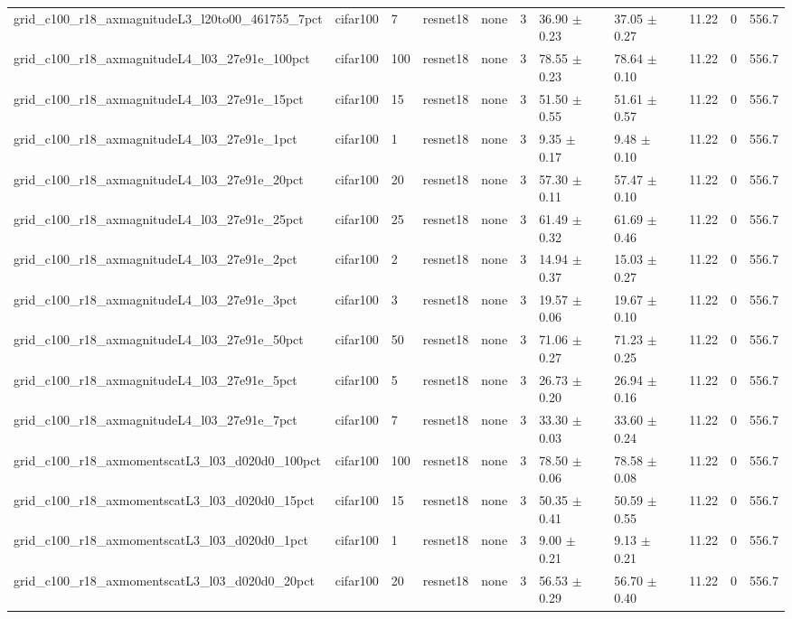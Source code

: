 \begin{tabular}{lllllllllll}
grid_c100_r18_axmagnitudeL3_l20to00_461755_7pct & cifar100 & 7 & resnet18 & none & 3 & 36.90 $\pm$ 0.23 & 37.05 $\pm$ 0.27 & 11.22 & 0 & 556.7 \\
grid_c100_r18_axmagnitudeL4_l03_27e91e_100pct & cifar100 & 100 & resnet18 & none & 3 & 78.55 $\pm$ 0.23 & 78.64 $\pm$ 0.10 & 11.22 & 0 & 556.7 \\
grid_c100_r18_axmagnitudeL4_l03_27e91e_15pct & cifar100 & 15 & resnet18 & none & 3 & 51.50 $\pm$ 0.55 & 51.61 $\pm$ 0.57 & 11.22 & 0 & 556.7 \\
grid_c100_r18_axmagnitudeL4_l03_27e91e_1pct & cifar100 & 1 & resnet18 & none & 3 & 9.35 $\pm$ 0.17 & 9.48 $\pm$ 0.10 & 11.22 & 0 & 556.7 \\
grid_c100_r18_axmagnitudeL4_l03_27e91e_20pct & cifar100 & 20 & resnet18 & none & 3 & 57.30 $\pm$ 0.11 & 57.47 $\pm$ 0.10 & 11.22 & 0 & 556.7 \\
grid_c100_r18_axmagnitudeL4_l03_27e91e_25pct & cifar100 & 25 & resnet18 & none & 3 & 61.49 $\pm$ 0.32 & 61.69 $\pm$ 0.46 & 11.22 & 0 & 556.7 \\
grid_c100_r18_axmagnitudeL4_l03_27e91e_2pct & cifar100 & 2 & resnet18 & none & 3 & 14.94 $\pm$ 0.37 & 15.03 $\pm$ 0.27 & 11.22 & 0 & 556.7 \\
grid_c100_r18_axmagnitudeL4_l03_27e91e_3pct & cifar100 & 3 & resnet18 & none & 3 & 19.57 $\pm$ 0.06 & 19.67 $\pm$ 0.10 & 11.22 & 0 & 556.7 \\
grid_c100_r18_axmagnitudeL4_l03_27e91e_50pct & cifar100 & 50 & resnet18 & none & 3 & 71.06 $\pm$ 0.27 & 71.23 $\pm$ 0.25 & 11.22 & 0 & 556.7 \\
grid_c100_r18_axmagnitudeL4_l03_27e91e_5pct & cifar100 & 5 & resnet18 & none & 3 & 26.73 $\pm$ 0.20 & 26.94 $\pm$ 0.16 & 11.22 & 0 & 556.7 \\
grid_c100_r18_axmagnitudeL4_l03_27e91e_7pct & cifar100 & 7 & resnet18 & none & 3 & 33.30 $\pm$ 0.03 & 33.60 $\pm$ 0.24 & 11.22 & 0 & 556.7 \\
grid_c100_r18_axmomentscatL3_l03_d020d0_100pct & cifar100 & 100 & resnet18 & none & 3 & 78.50 $\pm$ 0.06 & 78.58 $\pm$ 0.08 & 11.22 & 0 & 556.7 \\
grid_c100_r18_axmomentscatL3_l03_d020d0_15pct & cifar100 & 15 & resnet18 & none & 3 & 50.35 $\pm$ 0.41 & 50.59 $\pm$ 0.55 & 11.22 & 0 & 556.7 \\
grid_c100_r18_axmomentscatL3_l03_d020d0_1pct & cifar100 & 1 & resnet18 & none & 3 & 9.00 $\pm$ 0.21 & 9.13 $\pm$ 0.21 & 11.22 & 0 & 556.7 \\
grid_c100_r18_axmomentscatL3_l03_d020d0_20pct & cifar100 & 20 & resnet18 & none & 3 & 56.53 $\pm$ 0.29 & 56.70 $\pm$ 0.40 & 11.22 & 0 & 556.7 \\

\end{tabular}
